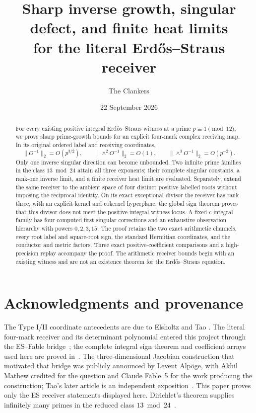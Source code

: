 \documentclass[11pt,reqno]{amsart}
\title[Sharp inverse growth for the Erd\H{o}s--Straus receiver]
{Sharp inverse growth, singular defect, and finite heat limits\\
for the literal Erd\H{o}s--Straus receiver}
\author{The Clankers}
\date{22 September 2026}
\begin{document}
\begin{abstract}
For every existing positive integral Erd\H{o}s--Straus witness at a prime
\(p\equiv1\pmod {12}\), we prove sharp prime-growth bounds for an explicit
four-mark complex receiving map. In its original ordered label and receiving
coordinates,
\[
 \|O^{-1}\|_2=O(p^{3/2}),\qquad
 \|\wedge^2O^{-1}\|_2=O(1),\qquad
 \|\wedge^3O^{-1}\|_2=O(p^{-2}).
\]
Only one inverse singular direction can become unbounded. Two infinite prime
families in the class \(13\bmod24\) attain all three exponents; their complete
singular constants, a rank-one inverse limit, and a finite receiver heat limit
are evaluated.  Separately, extend the same receiver to the ambient space of
four distinct positive labelled roots without imposing the reciprocal
identity. On its exact exceptional divisor the receiver has rank three, with
an explicit kernel and cokernel hyperplane; the global sign theorem proves that
this divisor does not meet the positive integral witness locus. A fixed-\(c\) integral family
has four computed first singular corrections and an exhaustive observation
hierarchy with powers \(0,2,3,15\). The proof retains the two exact arithmetic channels, every
root label and square-root sign, the standard Hermitian coordinates, and the
conductor and metric factors. Three exact positive-coefficient comparisons
and a high-precision replay accompany the proof. The arithmetic receiver bounds
begin with an existing witness and are not an existence theorem for the
Erd\H{o}s--Straus equation.
\end{abstract}
\maketitle







\section*{Acknowledgments and provenance}
The Type I/II coordinate antecedents are due to Elsholtz and Tao
\cite[\S2, Propositions 2.2 and 2.6]{ET}. The literal four-mark receiver and
its determinant polynomial entered this project through the ES--Fable
bridge~\cite{Receiver}; the complete integral sign theorem and coefficient
arrays used here are proved in~\cite{GlobalSign}. The three-dimensional
Jacobian construction that motivated that bridge was publicly announced by
Levent Alp\"oge, with Akhil Mathew credited for the question and Claude
Fable~5 for the work producing the construction; Tao's later article is an
independent exposition~\cite{TaoDigestion}. This paper proves only the ES
receiver statements displayed here. Dirichlet's theorem supplies infinitely
many primes in the reduced class \(13\bmod24\)~\cite{Dirichlet}.
\end{document}
